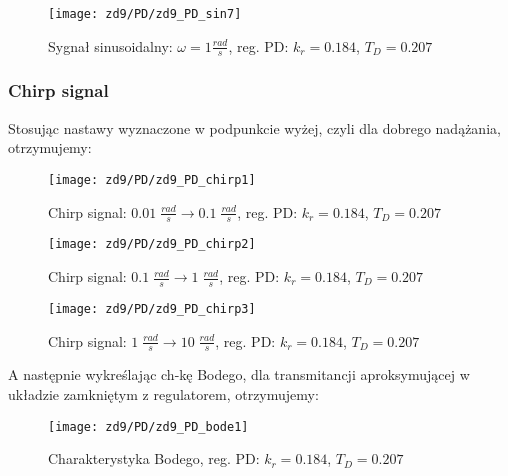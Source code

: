 \documentclass[11 pt]{article}
\begin{document}
\begin{figure}[h!]
	\centerline{
	\texttt{[image: zd9/PD/zd9\_PD\_sin7]}
	}
	\caption{Sygnał sinusoidalny: $\omega = 1 \frac{rad}{s}$, reg. PD: $k_r = 0.184$, $T_D = 0.207$}
\end{figure}

\newpage

\subsubsection*{Chirp signal}

\renewcommand{\w}{0.75}

Stosując nastawy wyznaczone w podpunkcie wyżej, czyli dla dobrego nadążania, otrzymujemy:

\begin{figure}[h!]
	\centerline{
	\texttt{[image: zd9/PD/zd9\_PD\_chirp1]}
	}
	\caption{Chirp signal: $0.01 \; \frac{rad}{s} \rightarrow 0.1 \; \frac{rad}{s}$, reg. PD: $k_r = 0.184$, $T_D = 0.207$}
	\label{fig:pd_chirp_k_start}
\end{figure}

\begin{figure}[h!]
	\centerline{
	\texttt{[image: zd9/PD/zd9\_PD\_chirp2]}
	}
	\caption{Chirp signal: $0.1 \; \frac{rad}{s} \rightarrow 1 \; \frac{rad}{s}$, reg. PD: $k_r = 0.184$, $T_D = 0.207$}
	\label{fig:pd_chirp3}
\end{figure}

\begin{figure}[h!]
	\centerline{
	\texttt{[image: zd9/PD/zd9\_PD\_chirp3]}
	}
	\caption{Chirp signal: $1 \; \frac{rad}{s} \rightarrow 10 \; \frac{rad}{s}$, reg. PD: $k_r = 0.184$, $T_D = 0.207$}
\end{figure}

\newpage

A następnie wykreślając ch-kę Bodego, dla transmitancji aproksymującej w układzie zamkniętym z regulatorem, otrzymujemy:

\begin{figure}[h!]
	\centerline{
	\texttt{[image: zd9/PD/zd9\_PD\_bode1]}
	}
	\caption{Charakterystyka Bodego, reg. PD: $k_r = 0.184$, $T_D = 0.207$}
	\label{fig:pd_bode3}
\end{figure}
\end{document}
